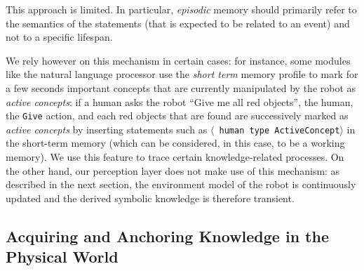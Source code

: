 \documentclass[preprint,3p,times]{elsarticle}
\newcommand{\concept}[1]{{\small \texttt{#1}}}
\newcommand{\stmt}[1]{{\footnotesize \tt $\langle$ #1\relax$\rangle$}}
\begin{document}
This approach is limited. In particular, \emph{episodic} memory should primarily
refer to the semantics of the statements (that is expected to be related to an
event) and not to a specific lifespan.

We rely however on this mechanism in certain cases: for instance, some modules
like the natural language processor use the {\it short term} memory profile to
mark for a few seconds important concepts that are currently manipulated by the
robot as \emph{active concepts}: if a human asks the robot ``Give
me all red objects'', the human, the \concept{Give} action, and each red
objects that are found are successively marked as \emph{active concepts} by
inserting statements such as \stmt{human type ActiveConcept} in the short-term
memory (which can be considered, in this case, to be a working memory). We use
this feature to trace certain knowledge-related processes. On the other hand,
our perception layer does not make use of this mechanism: as described in the
next section, the environment model of the robot is continuously updated and the
derived symbolic knowledge is therefore transient.


\subsection{Acquiring and Anchoring Knowledge in the Physical World}
\label{sect|sit-ass}
\end{document}
